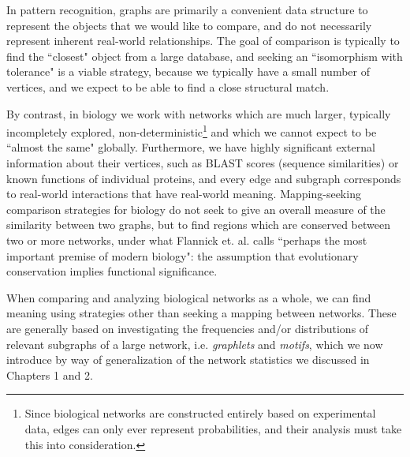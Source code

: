 \documentclass[12pt]{thesis}
\theoremstyle{plain}
\theoremstyle{definition}
\theoremstyle{remark}
\begin{document}
In pattern recognition, graphs are primarily a convenient data structure to represent the objects that we would like to compare, and do not necessarily represent inherent real-world relationships. The goal of comparison is typically to find the ``closest" object from a large database, and seeking an ``isomorphism with tolerance" is a viable strategy, because we typically have a small number of vertices, and we expect to be able to find a close structural match.  

By contrast, in biology we work with networks which are much larger, typically incompletely explored, non-deterministic\footnote{Since biological networks are constructed entirely based on experimental data, edges can only ever represent probabilities, and their analysis must take this into consideration.} and which we cannot expect to be ``almost the same" globally. Furthermore, we have highly significant external information about their vertices, such as BLAST scores (sequence similarities) or known functions of individual proteins, and every edge and subgraph corresponds to real-world interactions that have real-world meaning. Mapping-seeking comparison strategies for biology do not seek to give an overall measure of the similarity between two graphs, but to find regions which are conserved between two or more networks, under what Flannick et. al. \cite{flannick2006graemlin} calls ``perhaps the most important premise of modern biology": the assumption that evolutionary conservation implies functional significance.

When comparing and analyzing biological networks as a whole, we can find meaning using strategies other than seeking a mapping between networks. These are generally based on investigating the frequencies and/or distributions of relevant subgraphs of a large network, i.e. \textit{graphlets} and \textit{motifs}, which we now introduce by way of generalization of the network statistics we discussed in Chapters 1 and 2.
\end{document}
